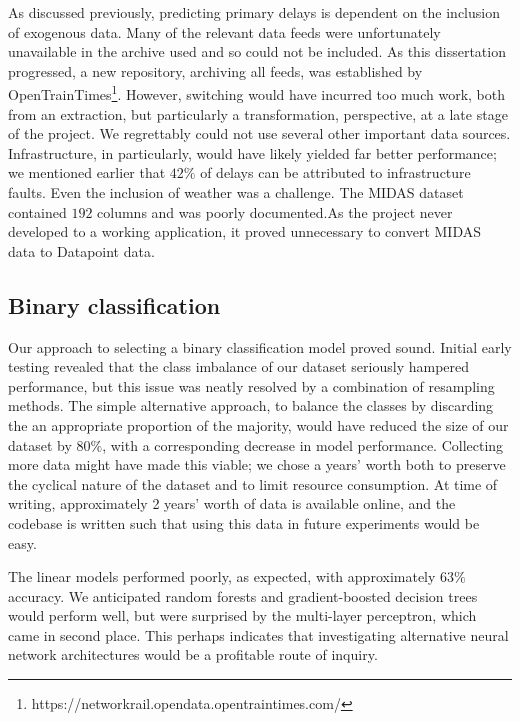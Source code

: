 \documentclass[12pt,a4paper]{article}
\begin{document}
As discussed previously, predicting primary delays is dependent on the inclusion of exogenous data. Many of the relevant data feeds were unfortunately unavailable in the archive used and so could not be included. As this dissertation progressed, a new repository, archiving all feeds, was established by OpenTrainTimes\footnote{https://networkrail.opendata.opentraintimes.com/}. However, switching would have incurred too much work, both from an extraction, but particularly a transformation, perspective, at a late stage of the project. We regrettably could not use several other important data sources. Infrastructure, in particularly, would have likely yielded far better performance; we mentioned earlier that $42\%$ of delays can be attributed to infrastructure faults. Even the inclusion of weather was a challenge. The MIDAS dataset contained $192$ columns and was poorly documented.As the project never developed to a working application, it proved unnecessary to convert MIDAS data to Datapoint data.

\subsection{Binary classification}

Our approach to selecting a binary classification model proved sound. Initial early testing revealed that the class imbalance of our dataset seriously hampered performance, but this issue was neatly resolved by a combination of resampling methods. The simple alternative approach, to balance the classes by discarding the an appropriate proportion of the majority, would have reduced the size of our dataset by $80\%$, with a corresponding decrease in model performance. Collecting more data might have made this viable; we chose a years' worth both to preserve the cyclical nature of the dataset and to limit resource consumption. At time of writing, approximately 2 years' worth of data is available online, and the codebase is written such that using this data in future experiments would be easy. 

The linear models performed poorly, as expected, with approximately $63\%$ accuracy. We anticipated random forests and gradient-boosted decision trees would perform well, but were surprised by the multi-layer perceptron, which came in second place. This perhaps indicates that investigating alternative neural network architectures would be a profitable route of inquiry. 
\end{document}
